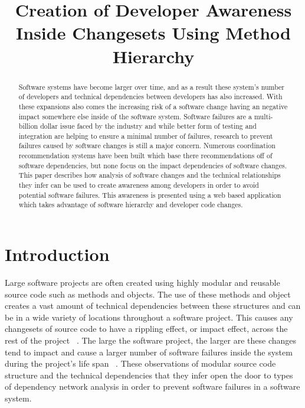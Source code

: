 \documentclass[conference]{IEEEtran}
\begin{document}
\title{Creation of Developer Awareness Inside Changesets Using Method Hierarchy}

\author{
}

\maketitle

\begin{abstract}
Software systems have become larger over time, and as a result these system's number of developers
and technical dependencies between developers has also increased. With these expansions also
comes the increasing risk of a software change having an negative impact somewhere else inside
of the software system. Software failures are a multi-billion dollar issue faced by the industry and
while better form of testing and integration are helping to ensure a minimal number of failures, 
research to prevent failures caused by software changes is still a major concern. Numerous coordination
recommendation systems have been built which base there recommendations off of software dependencies,
but none focus on the impact dependencies of software changes. This paper describes how analysis
of software changes and the technical relationships they infer can be used to create awareness among
developers in order to avoid potential software failures. This awareness is presented using a web based
application which takes advantage of software hierarchy and developer code changes.
\end{abstract}

\section{Introduction}
Large software projects are often created using highly modular and reusable source code such as methods
and objects. The use of these methods and object creates a vast amount of technical dependencies between
these structures and can be in a wide variety of locations throughout a software project. This causes any
changesets of source code to have a rippling effect, or impact effect, across the rest of the project
~\cite{Acharya:2011:PCI}. The large the software project, the larger are these changes tend to impact
and cause a larger number of software failures inside the system during the project's life span
~\cite{Zimmermann:2008:PDU}. These observations of modular source code structure and the
technical dependencies that they infer open the door to types of dependency network analysis
in order to prevent software failures in a software system.\\
\end{document}
